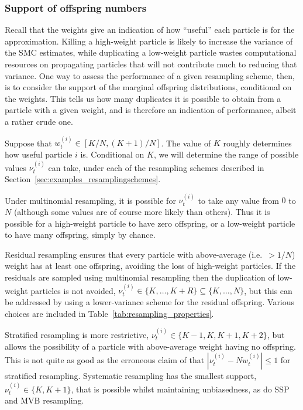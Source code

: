 \subsubsection{Support of offspring numbers}
Recall that the weights give an indication of how ``useful'' each particle is for the approximation. Killing a high-weight particle is likely to increase the variance of the SMC estimates, while duplicating a low-weight particle wastes computational resources on propagating particles that will not contribute much to reducing that variance.
One way to assess the performance of a given resampling scheme, then, is to consider the support of the marginal offspring distributions, conditional on the weights. This tells us how many duplicates it is possible to obtain from a particle with a given weight, and is therefore an indication of performance, albeit a rather crude one.

Suppose that $w_t^{(i)} \in [K/N, (K+1)/N]$. The value of $K$ roughly determines how useful particle $i$ is. Conditional on $K$, we will determine the range of possible values $\nu_t^{(i)}$ can take, under each  of the resampling schemes described in Section~\ref{sec:examples_resamplingschemes}.

Under multinomial resampling, it is possible for $\nu_t^{(i)}$ to take any value from $0$ to $N$ (although some values are of course more likely than others).
Thus it is possible for a high-weight particle to have zero offspring, or a low-weight particle to have many offspring, simply by chance.

Residual resampling ensures that every particle with above-average (i.e.\ $>1/N$) weight has at least one offspring, avoiding the loss of high-weight particles. If the residuals are sampled using multinomial resampling then the duplication of low-weight particles is not avoided, $\nu_t^{(i)} \in \{K, \dots, K+R\} \subseteq \{K,\dots, N\}$, but this can be addressed by using a lower-variance scheme for the residual offspring. Various choices are included in Table~\ref{tab:resampling_properties}.

Stratified resampling is more restrictive, $\nu_t^{(i)} \in \{ K-1, K, K+1, K+2 \}$, but allows the possibility of a particle with above-average weight having no offspring. This is not quite as good as the erroneous claim of \textcite{douc2005} that $| \nu_t^{(i)} - Nw_t^{(i)} | \leq 1$ for stratified resampling.
Systematic resampling has the smallest support, $\nu_t^{(i)} \in \{K, K+1\}$, that is possible whilst maintaining unbiasedness, as do SSP and MVB resampling.

